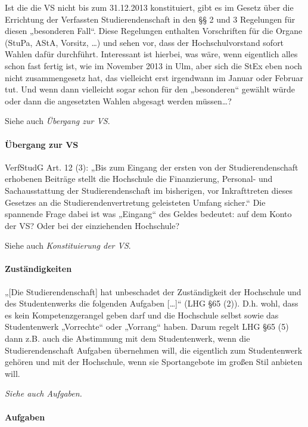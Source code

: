 \documentclass[
10pt,
a4paper,
twoside,								%
titlepage=false,							%
draft=false								%
]{scrartcl}
\begin{document}
Ist die die VS nicht bis zum 31.12.2013 konstituiert, gibt es im Gesetz über die Errichtung der Verfassten Studierendenschaft in den §§ 2 und 3 Regelungen für diesen „besonderen Fall“. Diese Regelungen enthalten Vorschriften für die Organe (StuPa, AStA, Vorsitz, …) und sehen vor, dass der Hochschulvorstand sofort Wahlen dafür durchführt. Interessant ist hierbei, was wäre, wenn eigentlich alles schon fast fertig ist, wie im November 2013 in Ulm, aber sich die StEx eben noch nicht zusammengesetz hat, das vielleicht erst irgendwann im Januar oder Februar tut. Und wenn dann vielleicht sogar schon für den „besonderen“ gewählt würde oder dann die angesetzten Wahlen abgesagt werden müssen…?

Siehe auch \emph{Übergang zur VS}.


\paragraph{Übergang zur VS}

VerfStudG Art. 12 (3): „Bis zum Eingang der ersten von der Studierendenschaft erhobenen Beiträge stellt die Hochschule die Finanzierung, Personal- und Sachausstattung der Studierendenschaft im bisherigen, vor Inkrafttreten dieses Gesetzes an die Studierendenvertretung geleisteten Umfang sicher.“ Die spannende Frage dabei ist was „Eingang“ des Geldes bedeutet: auf dem Konto der VS? Oder bei der einziehenden Hochschule?

Siehe auch \emph{Konstituierung der VS}.


\paragraph{Zuständigkeiten}

„[Die Studierendenschaft] hat unbeschadet der Zuständigkeit der Hochschule und des Studentenwerks die folgenden Aufgaben […]“ (LHG §65 (2)). D.h. wohl, dass es kein Kompetenzgerangel geben darf und die Hochschule selbst sowie das Studentenwerk „Vorrechte“ oder „Vorrang“ haben. Darum regelt LHG §65 (5) dann z.B. auch die Abstimmung mit dem Studentenwerk, wenn die Studierendenschaft Aufgaben übernehmen will, die eigentlich zum Studentenwerk gehören und mit der Hochschule, wenn sie Sportangebote im großen Stil anbieten will.

\emph{Siehe auch Aufgaben.}


\paragraph{Aufgaben}
\end{document}
